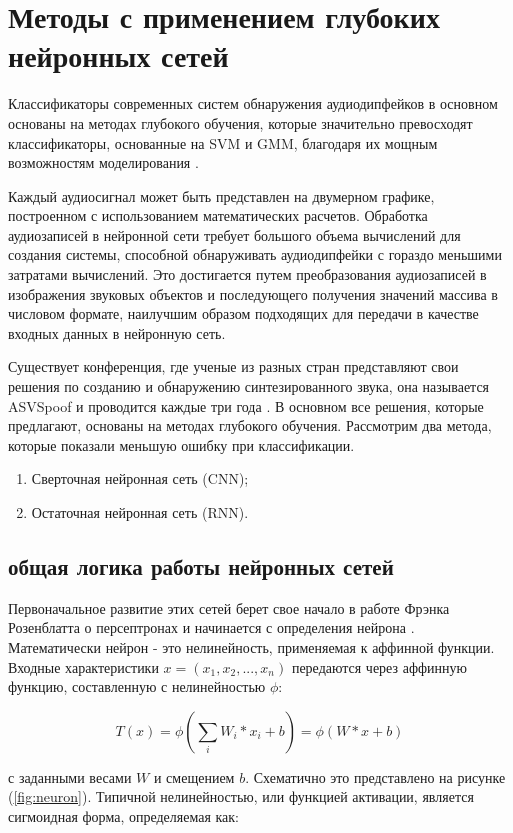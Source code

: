 \section{Методы с применением глубоких нейронных сетей}


Классификаторы современных систем обнаружения аудиодипфейков в основном основаны на методах глубокого обучения, которые значительно превосходят классификаторы, основанные на SVM и GMM, благодаря их мощным возможностям моделирования \cite{godoy2015using}.

Каждый аудиосигнал может быть представлен на двумерном графике, построенном с использованием математических расчетов. Обработка аудиозаписей в нейронной сети требует большого объема вычислений для создания системы, способной обнаруживать аудиодипфейки с гораздо меньшими затратами вычислений. Это достигается путем преобразования аудиозаписей в изображения звуковых объектов и последующего получения значений массива в числовом формате, наилучшим образом подходящих для передачи в качестве входных данных в нейронную сеть.

Существует конференция, где ученые из разных стран представляют свои решения по созданию и обнаружению синтезированного звука, она называется ASVSpoof и проводится каждые три года \cite{yamagishi2021asvspoof}. В основном все решения, которые предлагают, основаны на методах глубокого обучения. Рассмотрим два метода, которые показали меньшую ошибку при классификации.
\begin{enumerate}
    \item Сверточная нейронная сеть (CNN);
    \item Остаточная нейронная сеть (RNN).
\end{enumerate}

\subsection{общая логика работы нейронных сетей}

Первоначальное развитие этих сетей берет свое начало в работе Фрэнка Розенблатта о персептронах и начинается с определения нейрона \cite{DOU2023484}. Математически нейрон - это нелинейность, применяемая к аффинной функции. Входные характеристики \(x = (x_1, x_2, . . . , x_n)\) передаются через аффинную функцию, составленную с нелинейностью \(\phi\):

\[
    T(x) = \phi\left(\sum_{i} W_{i} \ast x_{i} + b\right) = \phi(W \ast x + b)
\]

с заданными весами \(W\) и смещением \(b\). Схематично это представлено на рисунке (\ref{fig:neuron}). Типичной нелинейностью, или функцией активации, является сигмоидная форма, определяемая как:

